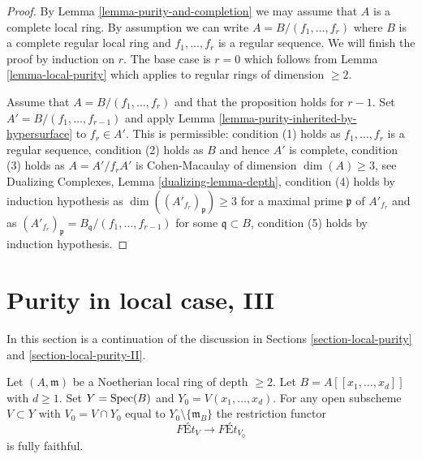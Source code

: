 \begin{proof}
By Lemma \ref{lemma-purity-and-completion} we may assume that $A$ is
a complete local ring. By assumption we can write
$A = B/(f_1, \ldots, f_r)$ where $B$ is a complete regular local
ring and $f_1, \ldots, f_r$ is a regular sequence.
We will finish the proof by induction on $r$.
The base case is $r = 0$ which follows from
Lemma \ref{lemma-local-purity} which applies to
regular rings of dimension $\geq 2$.

\medskip\noindent
Assume that $A = B/(f_1, \ldots, f_r)$ and that the proposition
holds for $r - 1$. Set $A' = B/(f_1, \ldots, f_{r - 1})$ and apply
Lemma \ref{lemma-purity-inherited-by-hypersurface} to $f_r \in A'$.
This is permissible:
condition (1) holds as $f_1, \ldots, f_r$ is a regular sequence,
condition (2) holds as $B$ and hence $A'$ is complete,
condition (3) holds as $A = A'/f_r A'$ is Cohen-Macaulay of dimension
$\dim(A) \geq 3$, see Dualizing Complexes, Lemma \ref{dualizing-lemma-depth},
condition (4) holds by induction hypothesis as
$\dim((A'_{f_r})_\mathfrak p) \geq 3$ for a maximal
prime $\mathfrak p$ of $A'_{f_r}$ and as
$(A'_{f_r})_\mathfrak p = B_\mathfrak q/(f_1, \ldots, f_{r - 1})$
for some $\mathfrak q \subset B$,
condition (5) holds by induction hypothesis.
\end{proof}




\section{Purity in local case, III}
\label{section-local-purity-III}

\noindent
In this section is a continuation of the discussion in
Sections \ref{section-local-purity} and \ref{section-local-purity-II}.

\begin{lemma}
\label{lemma-fully-faithful-power-series-over-depth2}
Let $(A, \mathfrak m)$ be a Noetherian local ring of depth $\geq 2$.
Let $B = A[[x_1, \ldots, x_d]]$ with $d \geq 1$.
Set $Y = \mathop{\mathrm{Spec}}(B)$ and $Y_0 = V(x_1, \ldots, x_d)$.
For any open subscheme $V \subset Y$ with
$V_0 = V \cap Y_0$ equal to $Y_0 \setminus \{\mathfrak m_B\}$
the restriction functor
$$
\textit{F\'Et}_V \longrightarrow \textit{F\'Et}_{V_0}
$$
is fully faithful.
\end{lemma}

